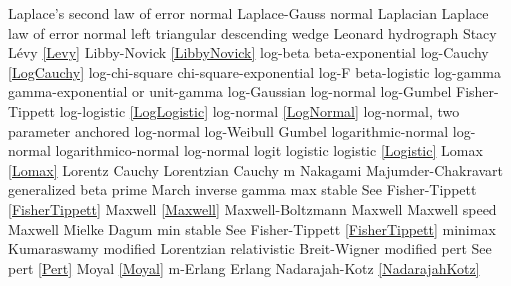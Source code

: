Laplace's second law of error  	\dotfill	normal 							\ncite	%
Laplace-Gauss					\dotfill	normal 							\ncite	%
Laplacian  						\dotfill	Laplace							\ncite 	%
law of error					\dotfill	normal 							\ncite	%
left triangular					\dotfill	descending wedge					\ncite	%
Leonard hydrograph				\dotfill	Stacy 							\ncite	%
L\'{e}vy 						\dotfill	\eqref{Levy}						\ncite	%
Libby-Novick					\dotfill	\eqref{LibbyNovick}					\ncite	
log-beta						\dotfill	beta-exponential					 	%
log-Cauchy						\dotfill	\eqref{LogCauchy}					\ncite
log-chi-square					\dotfill	chi-square-exponential				\ncite	%
log-F							\dotfill	beta-logistic						\ncite	%
log-gamma 						\dotfill	gamma-exponential or unit-gamma		\ncite	%
log-Gaussian					\dotfill	log-normal						\ncite	%
log-Gumbel						\dotfill	Fisher-Tippett						\ncite	%
log-logistic					\dotfill	\eqref{LogLogistic}  					\ncite	%
log-normal						\dotfill	\eqref{LogNormal}					\ncite	%
log-normal, two parameter			\dotfill	anchored log-normal					\ncite	%
log-Weibull 					\dotfill	Gumbel 							\ncite	%
logarithmic-normal				\dotfill	log-normal 						\ncite	%
logarithmico-normal				\dotfill	log-normal 						\ncite	%
logit							\dotfill	logistic 							\ncite	%
logistic 						\dotfill	\eqref{Logistic} 						\ncite	%
Lomax 							\dotfill	\eqref{Lomax}						\ncite	%
Lorentz  						\dotfill	Cauchy 							\ncite	%
Lorentzian  					\dotfill	Cauchy 							\ncite	%
%
m 								\dotfill	Nakagami 						 	%
Majumder-Chakravart				\dotfill	generalized beta prime				 %
March 							\dotfill	inverse gamma						\ncite	%
max stable						\dotfill	See Fisher-Tippett \eqref{FisherTippett}	\ncite
Maxwell 						\dotfill	\eqref{Maxwell} 					\ncite	%
Maxwell-Boltzmann 				\dotfill	Maxwell 							\ncite 	%
Maxwell speed					\dotfill	Maxwell 							\ncite	%
Mielke							\dotfill	Dagum							\ncite	%
min stable						\dotfill	See Fisher-Tippett \eqref{FisherTippett}	\ncite
minimax 						\dotfill	Kumaraswamy 						 	%
modified Lorentzian				\dotfill	relativistic Breit-Wigner					%
modified pert					\dotfill	See pert \eqref{Pert}					\ncite	%
Moyal							\dotfill	\eqref{Moyal}						\ncite	
m-Erlang						\dotfill	Erlang 							\ncite	%
%
Nadarajah-Kotz					\dotfill	\eqref{NadarajahKotz}				\mcite{\self}	%

